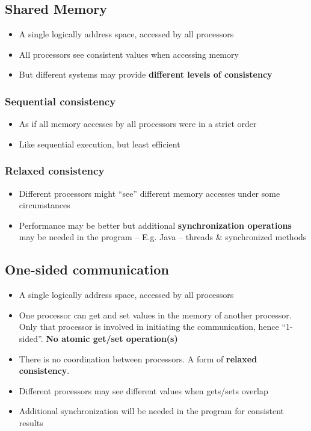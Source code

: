 \documentclass{article}
\begin{document}
\subsection{Shared Memory}
\begin{itemize}
  \item A single logically address space, accessed by all processors 
  \item All processors see consistent values when accessing memory 
  \item But different systems may provide \textbf{different levels of consistency}
\end{itemize}

\subsubsection{Sequential consistency}
\begin{itemize}
  \item As if all memory accesses by all processors were in a strict order 
  \item Like sequential execution, but least efficient
\end{itemize}

\subsubsection{Relaxed consistency}
\begin{itemize}
  \item Different processors might “see” different memory accesses under some circumstances 
  \item Performance may be better but additional \textbf{synchronization operations} may be needed in the program – E.g. Java – threads & synchronized methods
\end{itemize}

\subsection{One-sided communication}
\begin{itemize}
  \item A single logically address space, accessed by all processors 
  \item One processor can get and set values in the memory of another processor. Only that processor is involved in initiating the communication, hence “1-sided”. \textbf{No atomic get/set operation(s)} 
  \item There is no coordination between processors. A form of \textbf{relaxed consistency}.
  \item Different processors may see different values when gets/sets overlap
  \item Additional synchronization will be needed in the program for consistent results
\end{itemize}
\end{document}
